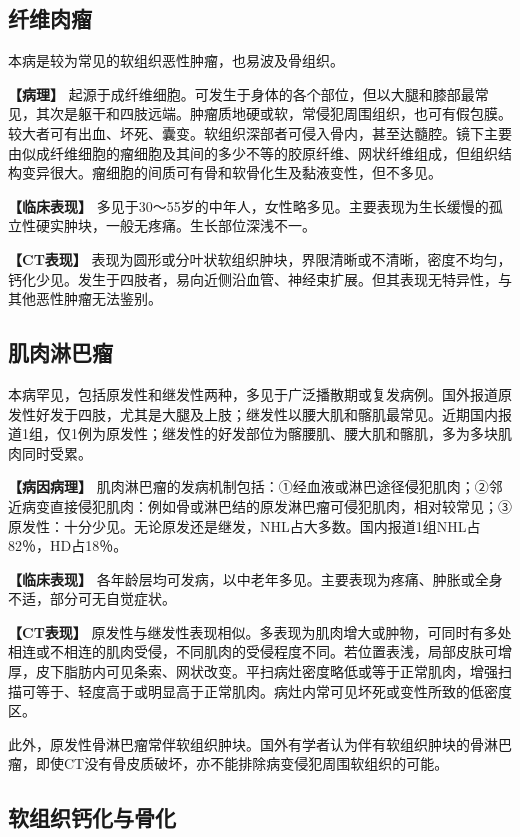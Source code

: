 \subsection{纤维肉瘤}

本病是较为常见的软组织恶性肿瘤，也易波及骨组织。

\textbf{【病理】}
起源于成纤维细胞。可发生于身体的各个部位，但以大腿和膝部最常见，其次是躯干和四肢远端。肿瘤质地硬或软，常侵犯周围组织，也可有假包膜。较大者可有出血、坏死、囊变。软组织深部者可侵入骨内，甚至达髓腔。镜下主要由似成纤维细胞的瘤细胞及其间的多少不等的胶原纤维、网状纤维组成，但组织结构变异很大。瘤细胞的间质可有骨和软骨化生及黏液变性，但不多见。

\textbf{【临床表现】}
多见于30～55岁的中年人，女性略多见。主要表现为生长缓慢的孤立性硬实肿块，一般无疼痛。生长部位深浅不一。

\textbf{【CT表现】}
表现为圆形或分叶状软组织肿块，界限清晰或不清晰，密度不均匀，钙化少见。发生于四肢者，易向近侧沿血管、神经束扩展。但其表现无特异性，与其他恶性肿瘤无法鉴别。

\subsection{肌肉淋巴瘤}

本病罕见，包括原发性和继发性两种，多见于广泛播散期或复发病例。国外报道原发性好发于四肢，尤其是大腿及上肢；继发性以腰大肌和髂肌最常见。近期国内报道1组，仅1例为原发性；继发性的好发部位为髂腰肌、腰大肌和髂肌，多为多块肌肉同时受累。

\textbf{【病因病理】}
肌肉淋巴瘤的发病机制包括：①经血液或淋巴途径侵犯肌肉；②邻近病变直接侵犯肌肉：例如骨或淋巴结的原发淋巴瘤可侵犯肌肉，相对较常见；③原发性：十分少见。无论原发还是继发，NHL占大多数。国内报道1组NHL占82％，HD占18％。

\textbf{【临床表现】}
各年龄层均可发病，以中老年多见。主要表现为疼痛、肿胀或全身不适，部分可无自觉症状。

\textbf{【CT表现】}
原发性与继发性表现相似。多表现为肌肉增大或肿物，可同时有多处相连或不相连的肌肉受侵，不同肌肉的受侵程度不同。若位置表浅，局部皮肤可增厚，皮下脂肪内可见条索、网状改变。平扫病灶密度略低或等于正常肌肉，增强扫描可等于、轻度高于或明显高于正常肌肉。病灶内常可见坏死或变性所致的低密度区。

此外，原发性骨淋巴瘤常伴软组织肿块。国外有学者认为伴有软组织肿块的骨淋巴瘤，即使CT没有骨皮质破坏，亦不能排除病变侵犯周围软组织的可能。

\subsection{软组织钙化与骨化}

